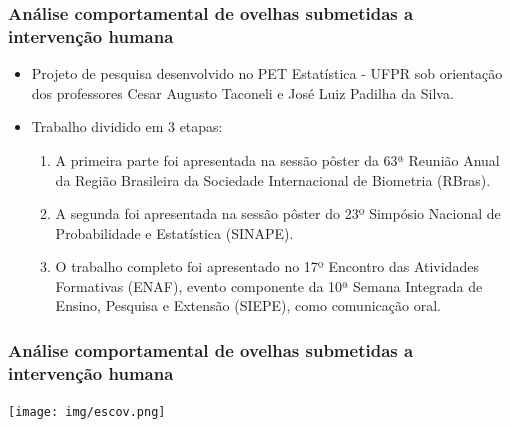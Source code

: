 \documentclass[10pt,
  aspectratio=169,
  serif,
  mathserif,
  professionalfont,
  compress,
  handout,
  ]{beamer}\usepackage[]{graphicx}\usepackage[]{color}
\begin{document}
\begin{frame}
  \frametitle{Análise comportamental de ovelhas submetidas a intervenção humana}
  \begin{itemize}
    \itemsep 2ex
  
  \item Projeto de pesquisa desenvolvido no PET Estatística - UFPR sob orientação dos professores Cesar Augusto Taconeli e José Luiz Padilha da Silva. 
  
  \item Trabalho dividido em 3 etapas:
  
  \begin{enumerate}
    \itemsep 2ex
    
    \item A primeira parte foi apresentada na sessão pôster da 63ª Reunião Anual da Região Brasileira da Sociedade Internacional de Biometria (RBras).
    
    \item A segunda foi apresentada na sessão pôster do 23º Simpósio Nacional de Probabilidade e Estatística (SINAPE).
    
    \item O trabalho completo foi apresentado no 17º Encontro das Atividades Formativas (ENAF), evento componente da 10ª Semana Integrada de Ensino, Pesquisa e Extensão (SIEPE), como comunicação oral.
    
  \end{enumerate}
  
  \end{itemize}
\end{frame}


\begin{frame}

\frametitle{Análise comportamental de ovelhas submetidas a intervenção humana}

\begin{center}
  \texttt{[image: img/escov.png]}
\end{center}

\end{frame}

\end{document}

